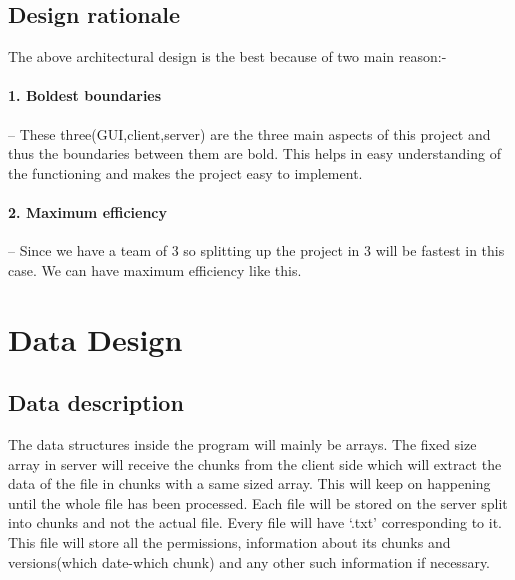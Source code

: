 \documentclass{article}
\begin{document}
	\subsection{Design rationale}
	The above architectural design is the best because of two main reason:-
\paragraph{1. Boldest boundaries}-- These three(GUI,client,server) are the three main aspects of this project and thus the boundaries between them are bold. This helps in easy understanding of the functioning and makes the project easy to implement.
\paragraph{2. Maximum efficiency}--
Since we have a team of 3 so splitting up the project in 3 will be fastest in this case. We can have maximum efficiency like this.
	\section{Data Design}\label{dd}
	 \subsection{Data description}
	 The data structures inside the program will mainly be arrays. The fixed size array in server will receive the chunks from the client side which will extract the data of the file in chunks with a same sized array. This will keep on happening until the whole file has been processed. Each file will be stored on the server split into chunks and not the actual file. Every file will have `.txt' corresponding to it. This file will store all the permissions, information about its chunks and versions(which date-which chunk) and any other such information if necessary.
	 
	
\end{document}

